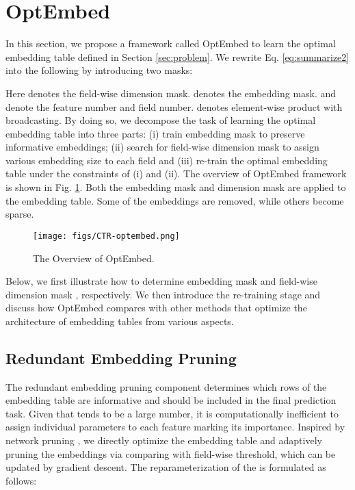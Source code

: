 \documentclass[sigconf]{acmart}
\begin{document}
%
 \section{OptEmbed}
\label{sec:optembed}

In this section, we propose a framework called OptEmbed to learn the optimal embedding table  defined in Section \ref{sec:problem}. We rewrite Eq. \ref{eq:summarize2} into the following by introducing two masks:


Here  denotes the field-wise dimension mask.  denotes the embedding mask.  and  denote the feature number and field number.  denotes element-wise product with broadcasting. By doing so, we decompose the task of learning the optimal embedding table  into three parts: (i) train embedding mask  to preserve informative embeddings; (ii) search for field-wise dimension mask  to assign various embedding size to each field and (iii) re-train the optimal embedding table  under the constraints of (i) and (ii). The overview of OptEmbed framework is shown in Fig. \ref{fig:overall}. Both the embedding mask and dimension mask are applied to the embedding table. Some of the embeddings are removed, while others become sparse.
\begin{figure}[!t]
    \centering
    \texttt{[image: figs/CTR-optembed.png]}
    \vspace{-5pt}
    \caption{The Overview of OptEmbed.}
    \vspace{-10pt}
    \label{fig:overall}
\end{figure}

Below, we first illustrate how to determine embedding mask  and field-wise dimension mask , respectively. We then introduce the re-training stage and discuss how OptEmbed compares with other methods that optimize the architecture of embedding tables from various aspects.

\subsection{Redundant Embedding Pruning}
\label{sec:feature_mask}


The redundant embedding pruning component determines which rows of the embedding table are informative and should be included in the final prediction task. Given that  tends to be a large number, it is computationally inefficient to assign individual parameters to each feature marking its importance. Inspired by network pruning \cite{DST,Cont_Spar}, we directly optimize the embedding table  and adaptively pruning the embeddings via comparing with field-wise threshold, which can be updated by gradient descent. The reparameterization of the  is formulated as follows:
\end{document}

